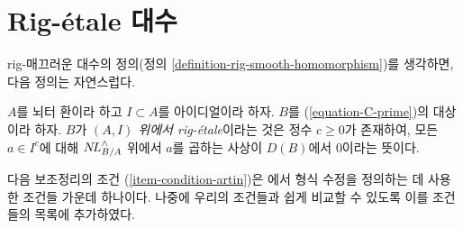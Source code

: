 \section{Rig-\'etale 대수}
\label{section-rig-etale}

\noindent
rig-매끄러운 대수의 정의(정의 \ref{definition-rig-smooth-homomorphism})를 생각하면,
다음 정의는 자연스럽다.

\begin{definition}
\label{definition-rig-etale-homomorphism}
$A$를 뇌터 환이라 하고 $I \subset A$를 아이디얼이라 하자.
$B$를 (\ref{equation-C-prime})의 대상이라 하자.
$B$가 {\it $(A, I)$ 위에서 rig-\'etale}이라는 것은 정수 $c \geq 0$가 존재하여,
모든 $a \in I^c$에 대해 $\mathop{N\!L}\nolimits_{B/A}^\wedge$ 위에서 $a$를 곱하는 사상이
$D(B)$에서 0이라는 뜻이다.
\end{definition}

\noindent
다음 보조정리의 조건 (\ref{item-condition-artin})은
\cite{ArtinII}에서 형식 수정을 정의하는 데 사용한 조건들 가운데 하나이다.
나중에 우리의 조건들과 쉽게 비교할 수 있도록 이를 조건들의 목록에 추가하였다.

